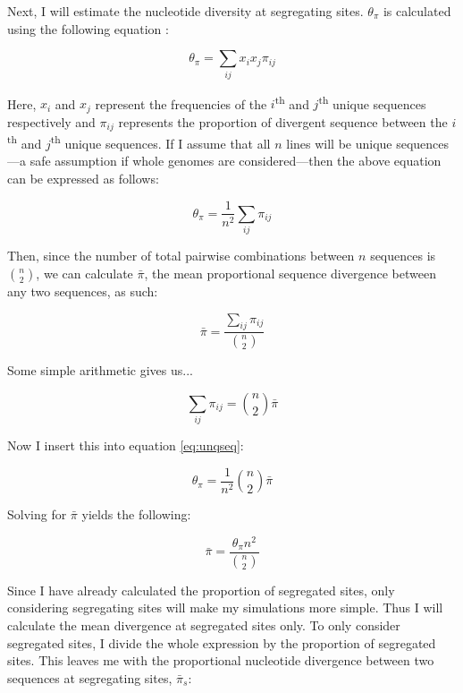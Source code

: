 Next, I will estimate the nucleotide diversity at segregating sites.
$\theta_{\pi}$ is calculated using the following equation \citep{Nei:1979hm}:

\begin{equation} \label{eq:nei}
    \theta_\pi = \sum_{ij} x_i x_j \pi_{ij}
\end{equation}

Here, $x_i$ and $x_j$ represent the frequencies of the $i$\textsuperscript{th} and 
$j$\textsuperscript{th} unique sequences respectively and $\pi_{ij}$ represents the
proportion of divergent sequence between the $i$\textsuperscript{th} and 
$j$\textsuperscript{th} unique sequences.
If I assume that all $n$ lines will be unique sequences—a safe assumption if whole
genomes are considered—then the above equation can be expressed as follows:

\begin{equation} \label{eq:unqseq}
    \theta_\pi = \frac{1}{n^2} \sum_{ij} \pi_{ij}
\end{equation}




Then, since the number of total pairwise combinations between $n$ sequences is
${n \choose 2}$, we can calculate $\bar{\pi}$, the mean proportional
sequence divergence between any two sequences, as such:

\begin{equation} \label{eq:barpi}
    \bar{\pi} = \frac{ \sum_{ij} \pi_{ij} }{ {n \choose 2} }
\end{equation}

Some simple arithmetic gives us...

\begin{equation} \label{eq:sumij}
    \sum_{ij} \pi_{ij} = {n \choose 2} \bar{\pi}
\end{equation}

Now I insert this into equation \ref{eq:unqseq}:

\begin{equation} \label{eq:insbpi}
    \theta_\pi = \frac{1}{n^2} {n \choose 2} \bar{\pi}
\end{equation}

Solving for $\bar{\pi}$ yields the following:

\begin{equation} \label{eq:solvebarpi}
    \bar{\pi} = \frac{\theta_\pi n^2}{{n \choose 2}}
\end{equation}


Since I have already calculated the proportion of segregated sites, only considering
segregating sites will make my simulations more simple. Thus I will calculate the mean
divergence at segregated sites only.
To only consider segregated sites, I divide the whole expression by the proportion 
of segregated sites.
This leaves me with the proportional nucleotide divergence between two sequences
at segregating sites, $\bar{\pi}_{s}$:

